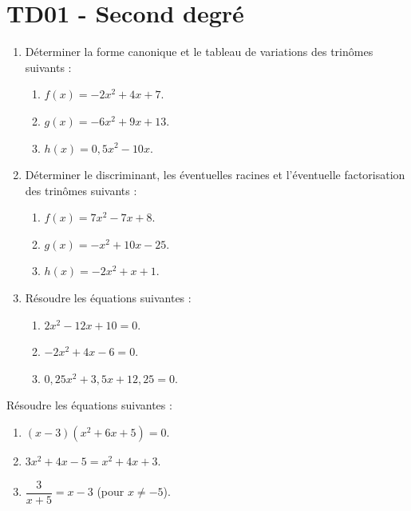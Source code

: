 \documentclass[a4paper,11pt]{article}
\author{Pierquet}
\title{\nomfichier}
\begin{document}
\pagestyle{fancy}

\setcounter{numexos}{0}

\part{TD01 - Second degré}

\medskip


\smallskip

\begin{enumerate}
	\item Déterminer la forme canonique et le tableau de variations des trinômes suivants :
	\begin{enumerate}
		\item $f(x)=-2x^2+4x+7$.
		\item $g(x)=-6x^2+9x+13$.
		\item $h(x)=0,5x^2-10x$.
	\end{enumerate}
	\item Déterminer le discriminant, les éventuelles racines et l'éventuelle factorisation des trinômes suivants :
	\begin{enumerate}
		\item $f(x)=7x^2-7x+8$.
		\item $g(x)=-x^2+10x-25$.
		\item $h(x)=-2x^2+x+1$.
	\end{enumerate}
	\item Résoudre les équations suivantes :
	\begin{enumerate}
		\item $2x^2-12x+10=0$.
		\item $-2x^2+4x-6=0$.
		\item $0,25x^2+3,5x+12,25=0$.
	\end{enumerate}
\end{enumerate}

\medskip


\medskip

Résoudre les équations suivantes :
%
\begin{enumerate}
	\item $(x-3)(x^2+6x+5)=0$.
	\item $3x^2+4x-5 = x^2 +4x+3$.
	\item $\dfrac{3}{x+5}=x-3$ (pour $x \neq -5$).
\end{enumerate}

\medskip

\end{document}
